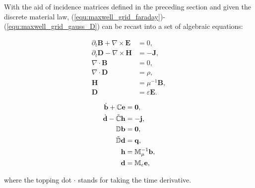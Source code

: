 \documentclass{article}
\begin{document}
With the aid of incidence matrices defined in the preceding section and given the discrete material law, (\ref{equ:maxwell_grid_faraday})-(\ref{equ:maxwell_grid_gauss_D}) can be recast into a set of algebraic equations:
\begin{center}
\vspace{-0.5cm}
\begin{minipage}{0.3\textwidth}
\begin{align*}
    \partial_t \mathbf{B} + \nabla \times \mathbf{E} &= 0, \\
    \partial_t \mathbf{D} - \nabla \times \mathbf{H} &= -\mathbf{J}, \\
    \nabla \cdot \mathbf{B} &= 0,  \\
    \nabla \cdot \mathbf{D} &= \rho, \\
    \mathbf{H} &= \mu^{-1} \mathbf{B}, \\
    \mathbf{D} &= \varepsilon \mathbf{E}. 
\end{align*}
\end{minipage}
\begin{minipage}{0.1\textwidth}
\centering
{}
\end{minipage}
\begin{minipage}{0.3\textwidth}
\begin{subequations}
\begin{align}
    \dot{\mathbf{b}} + \mathbb{C}\mathbf{e} &= \mathbf{0} , \label{equ:alg_faraday}\\
    \dot{\mathbf{d}} - \Tilde{\mathbb{C}}\mathbf{h} &= - \mathbf{j}, \label{equ:alg_empere}\\
    \mathbb{D}\mathbf{b} &= \mathbf{0},  \label{equ:alg_gauss_b}\\
    \Tilde{\mathbb{D}}\mathbf{d} &= \mathbf{q},  \label{equ:alg_gauss_d}\\
    \mathbf{h} &= \mathbb{M}_\mu^{-1} \mathbf{b}, \label{equ:alg_material_magnetic}\\
    \mathbf{d} &= \mathbb{M}_{\varepsilon} \mathbf{e}, \label{equ:alg_material_electric} 
\end{align}
\end{subequations}
\end{minipage}
\end{center}
where the topping dot $\cdot$ stands for taking the time derivative.
\end{document}

